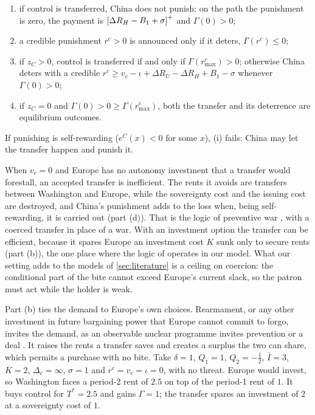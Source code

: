 \begin{corollary}
\begin{enumerate}[label=(\alph*)]
\begin{enumerate}[label=(\roman*)]
\item if control is transferred, China does not punish: on the path the punishment is zero, the payment is $\left[\Delta R_H-B_1+\sigma\right]^{+}$ and $\Gamma(0)>0$;
\item a credible punishment $r^c>0$ is announced only if it deters, $\Gamma(r^c)\le 0$;
\item if $z_C>0$, control is transferred if and only if $\Gamma(r^c_{\max})>0$; otherwise China deters with a credible $r^c\ge v_c-\iota+\Delta R_U-\Delta R_H+B_1-\sigma$ whenever $\Gamma(0)>0$;
\item if $z_C=0$ and $\Gamma(0)>0\ge\Gamma(r^c_{\max})$, both the transfer and its deterrence are equilibrium outcomes.
\end{enumerate}
If punishing is self-rewarding ($e^C(x)<0$ for some $x$), (i) fails: China may let the transfer happen and punish it.
\end{enumerate}
\end{corollary}

When $v_c=0$ and Europe has no autonomy investment that a transfer would forestall, an accepted transfer is inefficient. The rents it avoids are transfers between Washington and Europe, while the sovereignty cost and the issuing cost are destroyed, and China's punishment adds to the loss when, being self-rewarding, it is carried out (part (d)). That is the logic of preventive war \citep{fearon1995rationalist, powell2006war}, with a coerced transfer in place of a war. With an investment option the transfer can be efficient, because it spares Europe an investment cost $K$ sunk only to secure rents (part (b)), the one place where the logic of \citet{grossman1986costs} operates in our model. What our setting adds to the models of \cref{sec:literature} is a ceiling on coercion: the conditional part of the bite cannot exceed Europe's current slack, so the patron must act while the holder is weak.

Part (b) ties the demand to Europe's own choices. Rearmament, or any other investment in future bargaining power that Europe cannot commit to forgo, invites the demand, as an observable nuclear programme invites prevention or a deal \citep{debs2014known, spaniel2019bargaining}. It raises the rents a transfer saves and creates a surplus the two can share, which permits a purchase with no bite. Take $\delta=1$, $Q_1=1$, $Q_2=-\tfrac12$, $\bar I=3$, $K=2$, $\Delta_c=\infty$, $\sigma=1$ and $r^c=v_c=\iota=0$, with no threat. Europe would invest, so Washington faces a period-2 rent of $2.5$ on top of the period-1 rent of $1$. It buys control for $T^*=2.5$ and gains $\Gamma=1$; the transfer spares an investment of $2$ at a sovereignty cost of $1$.

